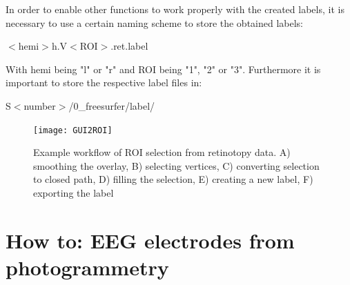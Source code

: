 \documentclass[12pt,a4paper]{scrartcl}
\begin{document}
\noindent In order to enable other functions to work properly with the created labels, it is necessary to use a certain naming scheme to store the obtained labels:\\
\begin{center}
  $<$hemi$>$h.V$<$ROI$>$.ret.label
\end{center}
\noindent With hemi being "l" or "r" and ROI being "1", "2" or "3". Furthermore it is important to store the respective label files in:\\
\begin{center}
  S$<$number$>$/0\_freesurfer/label/
\end{center}
\begin{figure}[!h]
  \texttt{[image: GUI2ROI]}

  \caption{Example workflow of ROI selection from retinotopy data. A) smoothing the overlay, B) selecting vertices, C) converting selection to closed path, D) filling the selection, E) creating a new label, F) exporting the label}

  \label{fig:GUI2ROI}
\end{figure}

\section{How to: EEG electrodes from photogrammetry}
\label{sec:HTphotogr}
\end{document}
